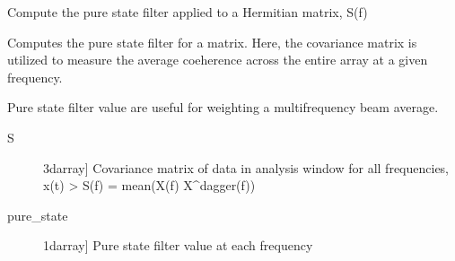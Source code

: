 \documentclass[letterpaper,10pt,english]{sphinxmanual}
\begin{document}
\begin{fulllineitems}
\label{\detokenize{infrapy.detection:infrapy.detection.beamforming_new.pure_state_filter}}
Compute the pure state filter applied to a Hermitian matrix, S(f)

Computes the pure state filter for a matrix.  Here, the covariance matrix is utilized
to measure the average coeherence across the entire array at a given frequency.

Pure state filter value are useful for weighting a multi\sphinxhyphen{}frequency beam average.
\begin{description}
\item[{S}] \leavevmode{[}3darray{]}
Covariance matrix of data in analysis window for all frequencies,
x(t) \textendash{}\textgreater{} S(f) = mean(X(f) X\textasciicircum{}dagger(f))

\end{description}
\begin{description}
\item[{pure\_state}] \leavevmode{[}1darray{]}
Pure state filter value at each frequency

\end{description}

\end{fulllineitems}

\end{document}
